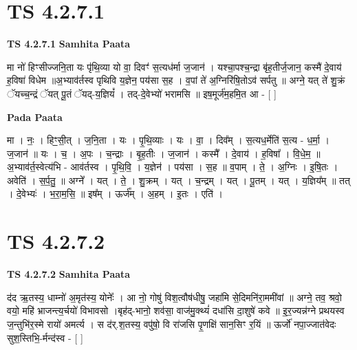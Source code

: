 \documentclass[17pt]{extarticle}
\begin{document}
\section*{ TS 4.2.7.1 }

\textbf{TS 4.2.7.1 } \newline
\textbf{Samhita Paata} \newline

मा नो॑ हिꣳसीज्जनि॒ता यः पृ॑थि॒व्या यो वा॒ दिवꣳ॑ स॒त्यध॑र्मा ज॒जान॑ । यश्चा॒पश्च॒न्द्रा बृ॑ह॒तीर्ज॒जान॒ कस्मै॑ दे॒वाय॑ ह॒विषा॑ विधेम ॥अ॒भ्याव॑र्तस्व पृथिवि य॒ज्ञेन॒ पय॑सा स॒ह । व॒पां ते॑ अ॒ग्निरि॑षि॒तोऽव॑ सर्पतु ॥ अग्ने॒ यत् ते॑ शु॒क्रं ॅयच्च॒न्द्रं ॅयत् पू॒तं ॅयद्-य॒ज्ञियं᳚ । तद्-दे॒वेभ्यो॑ भरामसि ॥ इष॒मूर्ज॑म॒हमि॒त आ - [  ] \newline

\textbf{Pada Paata} \newline

मा । नः॒ । हिꣳ॒॒सी॒त् । ज॒नि॒ता । यः । पृ॒थि॒व्याः । यः । वा॒ । दिव᳚म् । स॒त्यध॒र्मेति॑ स॒त्य - ध॒र्मा॒ । ज॒जान॑ ॥ यः । च॒ । अ॒पः । च॒न्द्राः । बृ॒ह॒तीः । ज॒जान॑ । कस्मै᳚ । दे॒वाय॑ । ह॒विषा᳚ । वि॒धे॒म॒ ॥ अ॒भ्याव॑र्त॒स्वेत्य॑भि - आव॑र्तस्व । पृ॒थि॒वि॒ । य॒ज्ञेन॑ । पय॑सा । स॒ह ॥ व॒पाम् । ते॒ । अ॒ग्निः । इ॒षि॒तः । अवेति॑ । स॒र्प॒तु॒ ॥ अग्ने᳚ । यत् । ते॒ । शु॒क्रम् । यत् । च॒न्द्रम् । यत् । पू॒तम् । यत् । य॒ज्ञिय᳚म् ॥ तत् । दे॒वेभ्यः॑ । भ॒रा॒म॒सि॒ ॥ इष᳚म् । ऊर्ज᳚म् । अ॒हम् । इ॒तः । एति॑ ।  \newline




\section*{ TS 4.2.7.2 }

\textbf{TS 4.2.7.2 } \newline
\textbf{Samhita Paata} \newline

द॑द ऋ॒तस्य॒ धाम्नो॑ अ॒मृत॑स्य॒ योनेः᳚ । आ नो॒ गोषु॑ विश॒त्वौष॑धीषु॒ जहा॑मि से॒दिमनि॑रा॒ममी॑वां ॥ अग्ने॒ तव॒ श्रवो॒ वयो॒ महि॑ भ्राजन्त्य॒र्चयो॑ विभावसो ।बृह॑द्-भानो॒ शव॑सा॒ वाज॑मु॒क्थ्यं॑ दधा॑सि दा॒शुषे॑ कवे ॥ इ॒र॒ज्यन्न॑ग्ने प्रथयस्व ज॒न्तुभि॑र॒स्मे रायो॑ अमर्त्य । स द॑र्.श॒तस्य॒ वपु॑षो॒ वि रा॑जसि पृ॒णक्षि॑ सान॒सिꣳ र॒यिं ॥ ऊर्जो॑ नपा॒ज्जात॑वेदः सुश॒स्तिभि॒-र्मन्द॑स्व - [  ] \newline
\end{document}
